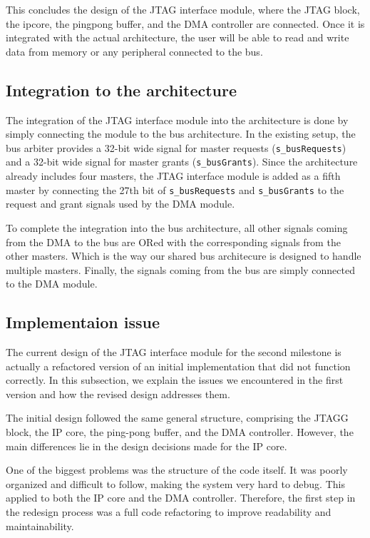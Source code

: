 \documentclass[a4paper,11pt,oneside]{report}
\begin{document}
This concludes the design of the JTAG interface module,  
where the JTAG block, the ipcore, the pingpong buffer, and the DMA controller are connected.  
Once it is integrated with the actual architecture, the user will be able to read and write data from memory or any peripheral connected to the bus.

\subsection{Integration to the architecture}

The integration of the JTAG interface module into the architecture is done by simply connecting the module to the bus architecture.  
In the existing setup, the bus arbiter provides a 32-bit wide signal for master requests (\texttt{s\_busRequests}) and a 32-bit wide signal for master grants (\texttt{s\_busGrants}).  
Since the architecture already includes four masters, the JTAG interface module is added as a fifth master by connecting the 27th bit of \texttt{s\_busRequests} and \texttt{s\_busGrants}  
to the request and grant signals used by the DMA module.  

To complete the integration into the bus architecture, all other signals coming from the DMA to the bus are ORed with the corresponding signals from the other masters.  
Which is the way our shared bus architecure is designed to handle multiple masters.
Finally, the signals coming from the bus are simply connected to the DMA module.


\subsection{Implementaion issue}

The current design of the JTAG interface module for the second milestone is actually a refactored version of an initial implementation that did not function correctly.  
In this subsection, we explain the issues we encountered in the first version and how the revised design addresses them.

The initial design followed the same general structure, comprising the JTAGG block, the IP core, the ping-pong buffer, and the DMA controller.  
However, the main differences lie in the design decisions made for the IP core.

One of the biggest problems was the structure of the code itself. It was poorly organized and difficult to follow, making the system very hard to debug.  
This applied to both the IP core and the DMA controller.  
Therefore, the first step in the redesign process was a full code refactoring to improve readability and maintainability.
\end{document}
